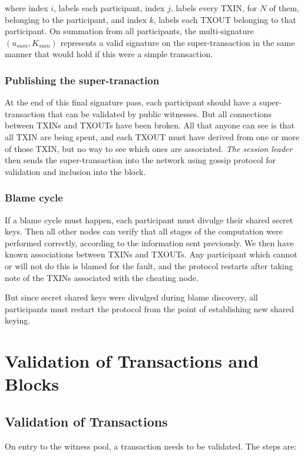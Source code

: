 \documentclass[a4paper, 10pt, conference]{ieeeconf}
\begin{document}
where index $i$, labels each participant, index $j$, labels every TXIN, for $N$ of them, belonging to the participant, and index $k$, labels each TXOUT belonging to that participant. On summation from all participants, the multi-signature $(u_{sum}, K_{sum})$ represents a valid signature on the super-transaction in the same manner that would hold if this were a simple transaction.

\subsubsection{Publishing the super-tranaction} At the end of this final signature pass, each participant should have a super-transaction that can be validated by public witnesses. But all connections between TXINs and TXOUTs have been broken. All that anyone can see is that all TXIN are being spent, and each TXOUT must have derived from one or more of those TXIN, but no way to see which ones are associated. \textit{The session leader} then sends the super-transaction into the network using gossip protocol for validation and inclusion into the block.

\subsubsection{Blame cycle} If a blame cycle must happen, each participant must divulge their shared secret keys. Then all other nodes can verify that all stages of the computation were performed correctly, according to the information sent previously. We then have known associations between TXINs and TXOUTs. Any participant which cannot or will not do this is blamed for the fault, and the protocol restarts after taking note of the TXINs associated with the cheating node.

But since secret shared keys were divulged during blame discovery, all participants must restart the protocol from the point of establishing new shared keying.

\section{Validation of Transactions and Blocks}\label{tx_processing}

\subsection{Validation of Transactions}
On entry to the witness pool, a transaction needs to be validated. The steps are:
\end{document}
